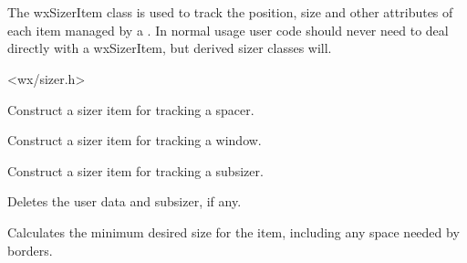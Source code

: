 
\section{}\label{wxsizeritem}

The wxSizerItem class is used to track the position, size and other
attributes of each item managed by a .  In
normal usage user code should never need to deal directly with a
wxSizerItem, but derived sizer classes will.





<wx/sizer.h>




\label{wxsizeritemwxsizeritem}


Construct a sizer item for tracking a spacer.



Construct a sizer item for tracking a window.



Construct a sizer item for tracking a subsizer.



\label{wxsizeritemdtor}


Deletes the user data and subsizer, if any.


\label{wxsizeritemcalcmin}


Calculates the minimum desired size for the item, including any space
needed by borders.


\label{wxsizeritemdeletewindows}


